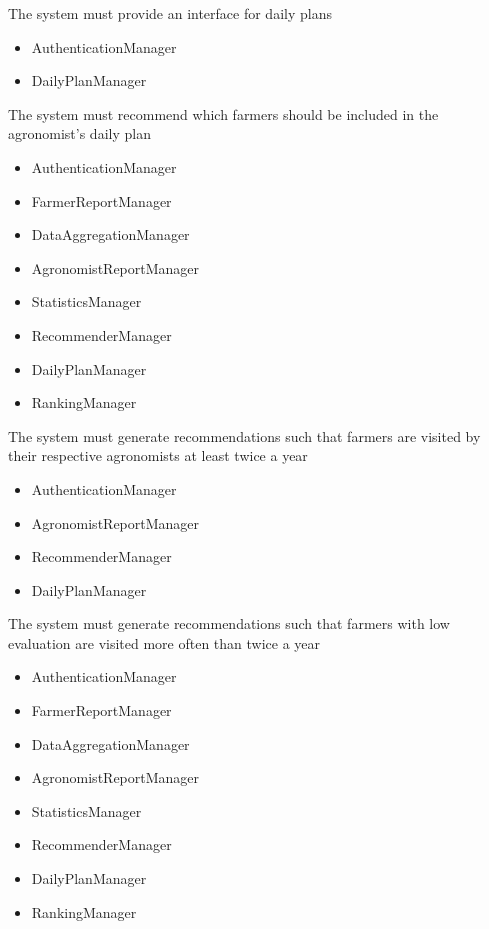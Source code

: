 \begin{itemize}
\begin{itemize}
\end{itemize}

  The system must provide an interface for daily plans
\begin{itemize}


\item AuthenticationManager
\item DailyPlanManager


\end{itemize}

  The system must recommend which farmers should be included in the agronomist's daily plan
\begin{itemize}

\item AuthenticationManager
\item FarmerReportManager
\item DataAggregationManager
\item AgronomistReportManager
\item StatisticsManager
\item RecommenderManager
\item DailyPlanManager
\item RankingManager

\end{itemize}

  The system must generate recommendations such that farmers are visited by their respective agronomists at least twice a year

\begin{itemize}

\item AuthenticationManager
\item AgronomistReportManager
\item RecommenderManager
\item DailyPlanManager

\end{itemize}
  The system must generate recommendations such that farmers with low evaluation are visited more often than twice a year
\begin{itemize}

\item AuthenticationManager
\item FarmerReportManager
\item DataAggregationManager
\item AgronomistReportManager
\item StatisticsManager
\item RecommenderManager
\item DailyPlanManager
\item RankingManager


\end{itemize}
\end{itemize}
